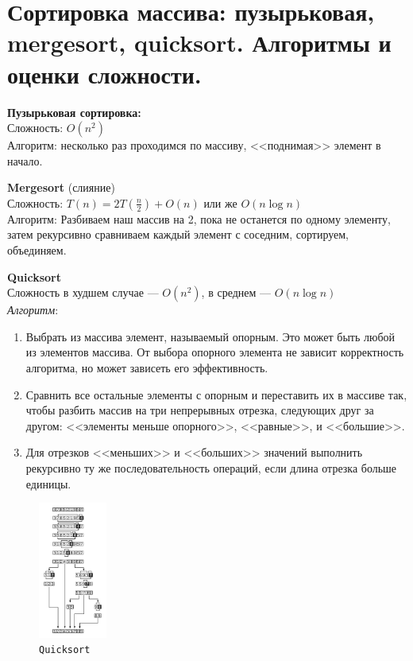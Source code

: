 \section{Сортировка массива: пузырьковая, mergesort, quicksort. Алгоритмы и оценки сложности.}


\textbf{Пузырьковая сортировка:}\\
Сложность: $O(n^2)$\\
Алгоритм: несколько раз проходимся по массиву, <<поднимая>> элемент в начало.

\textbf{Mergesort} (слияние)\\
Сложность: $T(n)=2T(\frac{n}{2})+O(n)$ или же $O(n\log n)$\\
Алгоритм: Разбиваем наш массив на 2, пока не останется по одному элементу, затем рекурсивно сравниваем каждый элемент с соседним, сортируем, объединяем.

\textbf{Quicksort}\\
Сложность в худшем случае --- $O(n^2)$, в среднем --- $O(n\log n)$\\
\textit{Алгоритм}:
\begin{enumerate}
	\item Выбрать из массива элемент, называемый опорным. Это может быть любой из элементов массива. От выбора опорного элемента не зависит корректность алгоритма, но может зависеть его эффективность.
	\item Сравнить все остальные элементы с опорным и переставить их в массиве так, чтобы разбить массив на три непрерывных отрезка, следующих друг за другом: <<элементы меньше опорного>>, <<равные>>, и <<большие>>.
	
	\item Для отрезков <<меньших>> и <<больших>> значений выполнить рекурсивно ту же последовательность операций, если длина отрезка больше единицы.
\end{enumerate}
\begin{figure}[!ht]
\centering
\includegraphics[width=0.2\textwidth]{img_easy/2_1.png}
\caption{\texttt{Quicksort}}
\end{figure}
